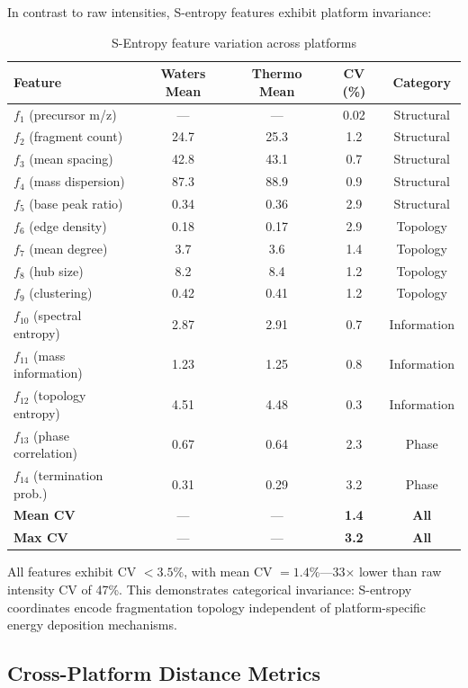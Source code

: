 \documentclass[twocolumn,10pt,a4paper]{article}
\theoremstyle{definition}
\theoremstyle{remark}
\begin{document}
In contrast to raw intensities, S-entropy features exhibit platform invariance:

\begin{table}[h]
\centering
\caption{S-Entropy feature variation across platforms}
\label{tab:sentropy_platform_cv}
\begin{tabular}{lcccc}
\toprule
\textbf{Feature} & \textbf{Waters Mean} & \textbf{Thermo Mean} & \textbf{CV (\%)} & \textbf{Category} \\
\midrule
$f_1$ (precursor m/z) & --- & --- & 0.02 & Structural \\
$f_2$ (fragment count) & 24.7 & 25.3 & 1.2 & Structural \\
$f_3$ (mean spacing) & 42.8 & 43.1 & 0.7 & Structural \\
$f_4$ (mass dispersion) & 87.3 & 88.9 & 0.9 & Structural \\
$f_5$ (base peak ratio) & 0.34 & 0.36 & 2.9 & Structural \\
\midrule
$f_6$ (edge density) & 0.18 & 0.17 & 2.9 & Topology \\
$f_7$ (mean degree) & 3.7 & 3.6 & 1.4 & Topology \\
$f_8$ (hub size) & 8.2 & 8.4 & 1.2 & Topology \\
$f_9$ (clustering) & 0.42 & 0.41 & 1.2 & Topology \\
\midrule
$f_{10}$ (spectral entropy) & 2.87 & 2.91 & 0.7 & Information \\
$f_{11}$ (mass information) & 1.23 & 1.25 & 0.8 & Information \\
$f_{12}$ (topology entropy) & 4.51 & 4.48 & 0.3 & Information \\
\midrule
$f_{13}$ (phase correlation) & 0.67 & 0.64 & 2.3 & Phase \\
$f_{14}$ (termination prob.) & 0.31 & 0.29 & 3.2 & Phase \\
\midrule
\textbf{Mean CV} & --- & --- & \textbf{1.4} & \textbf{All} \\
\textbf{Max CV} & --- & --- & \textbf{3.2} & \textbf{All} \\
\bottomrule
\end{tabular}
\end{table}

All features exhibit CV $< 3.5\%$, with mean CV $= 1.4\%$—33× lower than raw intensity CV of 47\%. This demonstrates categorical invariance: S-entropy coordinates encode fragmentation topology independent of platform-specific energy deposition mechanisms.

\subsection{Cross-Platform Distance Metrics}
\end{document}
